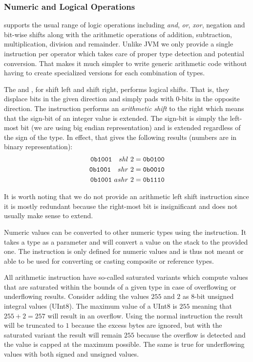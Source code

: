 \subsubsection{Numeric and Logical Operations}
\label{sec:design:stack:logic}

\thename{} supports the usual range of logic operations including \emph{and},
\emph{or}, \emph{xor}, negation and bit-wise shifts along with the arithmetic
operations of addition, subtraction, multiplication, division and
remainder. Unlike JVM we only provide a single instruction per operator which
takes care of proper type detection and potential conversion. That makes it much
simpler to write generic arithmetic code without having to create specialized
versions for each combination of types.

The  and , for shift left and shift right,
performs logical shifts. That is, they displace bits in the given direction and
simply pads with 0-bits in the opposite direction. The 
instruction performs an \textit{arithmetic shift} to the right which means that
the sign-bit of an integer value is extended. The sign-bit is simply the
left-most bit (we are using big endian representation) and is extended
regardless of the sign of the type. In effect, that gives the following results
(numbers are in binary representation):
\begin{align*}
  {\tt 0b1001}\ \ \ shl\  2 &= {\tt 0b0100} \\
  {\tt 0b1001}\ \ \ shr\  2 &= {\tt 0b0010} \\
  {\tt 0b1001}\     ashr\ 2 &= {\tt 0b1110}
\end{align*}

It is worth noting that we do not provide an arithmetic left shift instruction
since it is mostly redundant because the right-most bit is insignificant and
does not usually make sense to extend.

Numeric values can be converted to other numeric types using the 
instruction. It takes a type as a parameter and will convert a value on the
stack to the provided one. The  instruction is only defined for
numeric values and is thus not meant or able to be used for converting or
casting composite or reference types.

All arithmetic instruction have so-called saturated variants which compute
values that are saturated within the bounds of a given type in case of
overflowing or underflowing results. Consider adding the values $255$ and $2$ as
8-bit unsigned integral values (UInt8). The maximum value of a UInt8 is $255$
meaning that $255+2=257$ will result in an overflow. Using the normal
 instruction the result will be truncated to $1$ because the excess
bytes are ignored, but with the saturated variant the result will remain $255$
because the overflow is detected and the value is capped at the maximum
possible. The same is true for underflowing values with both signed and unsigned
values.

